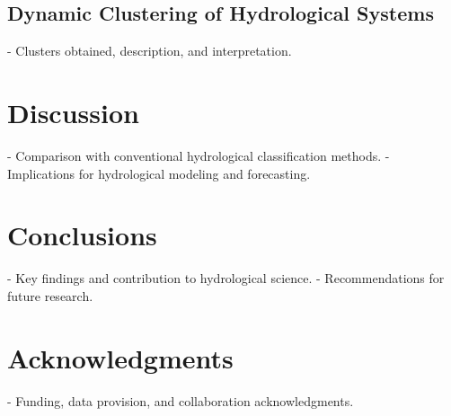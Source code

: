 \documentclass[11pt,a4paper]{article}
\begin{document}
\subsection{Dynamic Clustering of Hydrological Systems}
- Clusters obtained, description, and interpretation.

\section{Discussion}
- Comparison with conventional hydrological classification methods.
- Implications for hydrological modeling and forecasting.

\section{Conclusions}
- Key findings and contribution to hydrological science.
- Recommendations for future research.

\section*{Acknowledgments}
- Funding, data provision, and collaboration acknowledgments.



\end{document}
